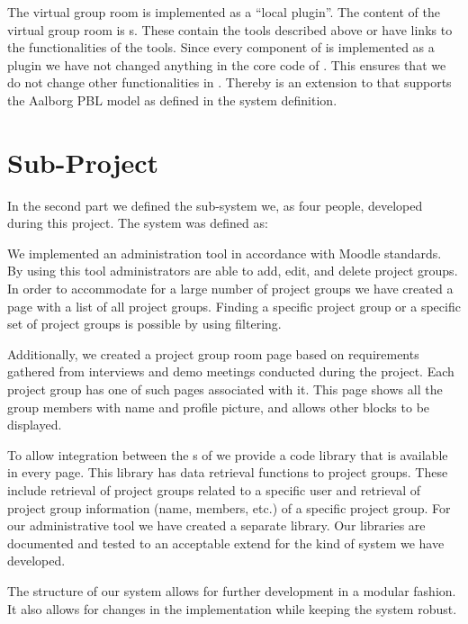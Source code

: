 The virtual group room is implemented as a ``local plugin''.
The content of the virtual group room is \block{}s.
These contain the tools described above or have links to the functionalities of the tools.
Since every component of \system{} is implemented as a \moodle{} plugin we have not changed anything in the core code of \moodle{}.
This ensures that we do not change other functionalities in \moodle{}.
Thereby \system{} is an extension to \moodle{} that supports the Aalborg PBL model as defined in the system definition.

\section{Sub-Project}
\label{sec:subconclusion}

In the second part we defined the sub-system we, as four people, developed during this project.
The system was defined as:



We implemented an administration tool in accordance with Moodle standards.
By using this tool administrators are able to add, edit, and delete project groups.
In order to accommodate for a large number of project groups we have created a page with a list of all project groups.
Finding a specific project group or a specific set of project groups is possible by using filtering.

Additionally, we created a project group room page based on requirements gathered from interviews and demo meetings conducted during the project.
Each project group has one of such pages associated with it.
This page shows all the group members with name and profile picture, and allows other \system{} blocks to be displayed.

To allow integration between the \subsystem{}s of \system{} we provide a code library that is available in every \moodle{} page.
This library has data retrieval functions to project groups.
These include retrieval of project groups related to a specific user and retrieval of project group information (name, members, etc.) of a specific project group.
For our administrative tool we have created a separate library.
Our libraries are documented and tested to an acceptable extend for the kind of system we have developed.

The structure of our system allows for further development in a modular fashion.
It also allows for changes in the implementation while keeping the system robust.











